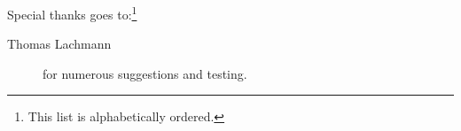 %
Special thanks goes to:\footnote{This list is alphabetically ordered.}
\begin{description}
  \item[Thomas Lachmann] for numerous suggestions and testing.
\end{description}
